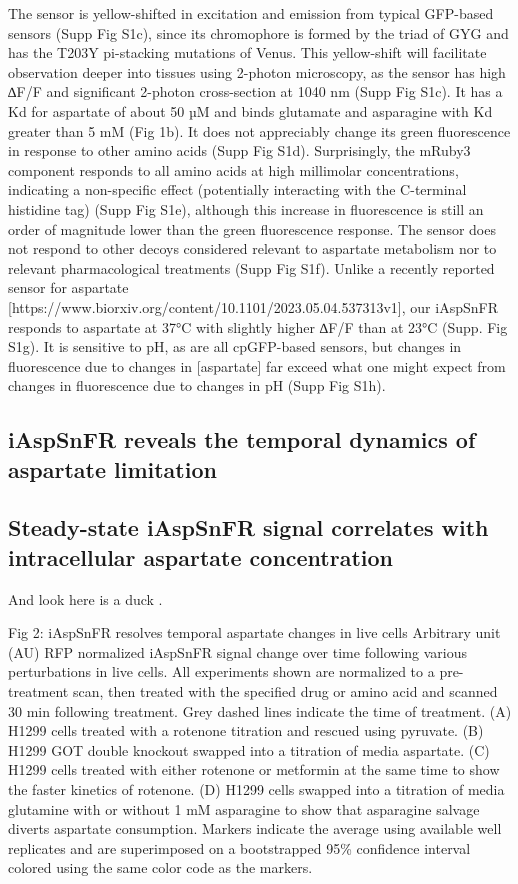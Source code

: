 \documentclass[9pt,lineno]{elife}
\begin{document}
The sensor is yellow-shifted in excitation and emission from typical GFP-based sensors (Supp Fig S1c), since its chromophore is formed by the triad of GYG and has the T203Y pi-stacking mutations of Venus.
This yellow-shift will facilitate observation deeper into tissues using 2-photon microscopy, as the sensor has high ∆F/F and significant 2-photon cross-section at 1040 nm (Supp Fig S1c).
It has a Kd for aspartate of about 50 µM and binds glutamate and asparagine with Kd greater than 5 mM (Fig 1b). It does not appreciably change its green fluorescence in response to other amino acids (Supp Fig S1d).
Surprisingly, the mRuby3 component responds to all amino acids at high millimolar concentrations, indicating a non-specific effect (potentially interacting with the C-terminal histidine tag) (Supp Fig S1e), although this increase in fluorescence is still an order of magnitude lower than the green fluorescence response.
The sensor does not respond to other decoys considered relevant to aspartate metabolism nor to relevant pharmacological treatments (Supp Fig S1f). Unlike a recently reported sensor for aspartate [https://www.biorxiv.org/content/10.1101/2023.05.04.537313v1], our iAspSnFR responds to aspartate at 37°C with slightly higher ∆F/F than at 23°C (Supp. Fig S1g).
It is sensitive to pH, as are all cpGFP-based sensors, but changes in fluorescence due to changes in [aspartate] far exceed what one might expect from changes in fluorescence due to changes in pH (Supp Fig S1h).


\subsection{iAspSnFR reveals the temporal dynamics of aspartate limitation}
\lipsum[5]




\subsection{Steady-state iAspSnFR signal correlates with intracellular aspartate concentration}
\lipsum[7]


And look here is a duck .



Fig 2:
iAspSnFR resolves temporal aspartate changes in live cells
Arbitrary unit (AU) RFP normalized iAspSnFR signal change over time following various perturbations in live cells. All experiments shown are normalized to a pre-treatment scan, then treated with the specified drug or amino acid and scanned 30 min following treatment. Grey dashed lines indicate the time of treatment. (A) H1299 cells treated with a rotenone titration and rescued using pyruvate. (B) H1299 GOT double knockout swapped into a titration of media aspartate. (C) H1299 cells treated with either rotenone or metformin at the same time to show the faster kinetics of rotenone. (D) H1299 cells swapped into a titration of media glutamine with or without 1 mM asparagine to show that asparagine salvage diverts aspartate consumption. Markers indicate the average using available well replicates and are superimposed on a bootstrapped 95\% confidence interval colored using the same color code as the markers.
\end{document}
